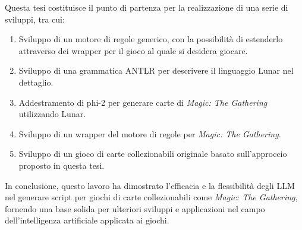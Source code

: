 Questa tesi costituisce il punto di partenza per la realizzazione di una serie di sviluppi, tra cui:

\begin{enumerate}[label=\alph*.]
    \item Sviluppo di un motore di regole generico, con la possibilità di estenderlo attraverso dei wrapper per il gioco al quale si desidera giocare.
    \item Sviluppo di una grammatica ANTLR per descrivere il linguaggio Lunar nel dettaglio.
    \item Addestramento di phi-2 per generare carte di \emph{Magic: The Gathering} utilizzando Lunar.
    \item Sviluppo di un wrapper del motore di regole per \emph{Magic: The Gathering}.
    \item Sviluppo di un gioco di carte collezionabili originale basato sull'approccio proposto in questa tesi.
\end{enumerate}

In conclusione, questo lavoro ha dimostrato l'efficacia e la flessibilità degli LLM nel generare script per giochi di carte collezionabili come \emph{Magic: The Gathering}, fornendo una base solida per ulteriori sviluppi e applicazioni nel campo dell'intelligenza artificiale applicata ai giochi.